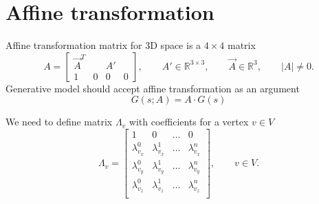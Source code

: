 \section{Affine transformation}

Affine transformation matrix for 3D space is a $4 \times 4$ matrix
\begin{equation*}
  A = \begin{bmatrix}
    \vec{A}^T  & & A' & \\
    1 & 0 & 0 & 0
  \end{bmatrix},
  \qquad A' \in \mathbb{R}^{3 \times 3},
  \qquad \vec{A} \in \mathbb{R}^3,
  \qquad \left| A \right| \neq 0.
\end{equation*}
Generative model should accept affine transformation as an argument
\begin{equation*}
  G\left( s; A \right) = A \cdot G\left( s \right)
\end{equation*}

We need to define matrix $\Lambda_v$ with coefficients for
a vertex $v \in V$
\begin{equation*}
  \Lambda_v = \begin{bmatrix}
    1               & 0               & \dots & 0 \\
    \lambda^0_{v_x} & \lambda^1_{v_x} & \dots & \lambda^n_{v_x} \\
    \lambda^0_{v_y} & \lambda^1_{v_y} & \dots & \lambda^n_{v_y} \\
    \lambda^0_{v_z} & \lambda^1_{v_z} & \dots & \lambda^n_{v_z} \\
  \end{bmatrix},
  \qquad v \in V.
\end{equation*}

